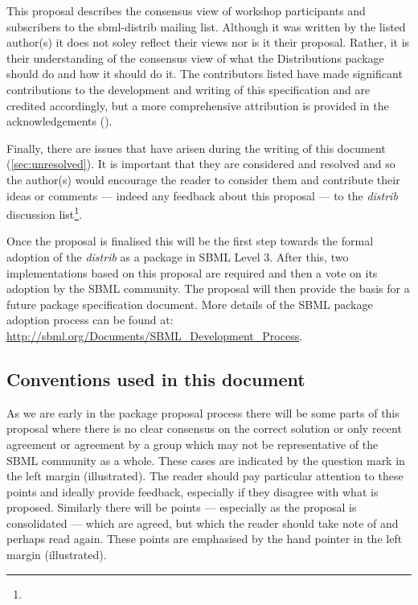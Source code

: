 \documentclass[draftspec]{sbmlpkgspec}
\newcommand{\distribshort}{\emph{distrib}\xspace}
\newcommand{\distrib}{Distributions\xspace}
\newcommand{\watchout}{\marginpar{\hspace*{34pt}\raisebox{-0.5ex}{\Large\ding{43}}}}
\newcommand{\controversial}{\marginpar{\hspace*{34pt}\raisebox{-0.5ex}{\Large?}}}
\begin{document}
This proposal describes the consensus view of workshop participants
and subscribers to the sbml-distrib mailing list. Although it was
written by the listed author(s) it does not soley reflect their views nor is
it their proposal. Rather, it is their understanding of the consensus
view of what the \distrib package should do and how it should do
it. The contributors listed have made significant contributions to the
development and writing of this specification and are credited
accordingly, but a more comprehensive attribution is provided in the
acknowledgements ().

Finally, there are issues that have arisen during the writing of this
document (\ref{sec:unresolved}). It is important that they are
considered and resolved and so the author(s) would encourage the
reader to consider them and contribute their ideas or comments ---
indeed any feedback about this proposal --- to the \distribshort
discussion list\footnote{}.

Once the proposal is finalised this will be the first step towards the
formal adoption of the \distribshort as a package in SBML Level
3. After this, two implementations based on this proposal are required
and then a vote on its adoption by the SBML community. The proposal
will then provide the basis for a future package specification
document. More details of the SBML package adoption process can be
found at: \url{http://sbml.org/Documents/SBML_Development_Process}.


\subsection{Conventions used in this document}

As we are early in the package proposal process there will be some
parts of this proposal where there is no clear consensus on the
correct solution or only recent agreement or agreement by a group
which may not be representative of the SBML community as a
whole. These cases are indicated by the \controversial question mark
in the left margin (illustrated). The reader should pay particular
attention to these points and ideally provide feedback, especially if
they disagree with what is proposed. Similarly there will be points
--- especially as the proposal is consolidated --- which are agreed,
but which the reader should take note of and perhaps read again. These
points \watchout are emphasised by the hand pointer in the left margin
(illustrated).
\end{document}
